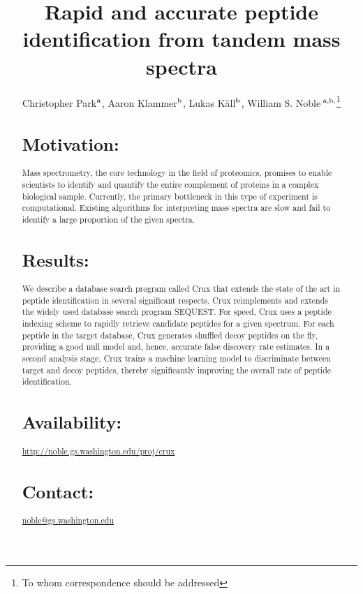 \documentclass{bioinfo}
\begin{document}

\title[Rapid and accurate peptide identification]{Rapid and accurate
  peptide identification from tandem mass spectra}
\author[Park \textit{et~al}]{Christopher Park$^{\rm a}$,
Aaron Klammer$^{\rm b}$,
Lukas K\"{a}ll$^{\rm b}$, 
William S. Noble\,$^{\rm a,b,}$\footnote{To whom correspondence should be addressed}}
\address{
$^{\rm a}$Department of Computer Science and Engineering,
$^{\rm b}$Department of Genome Sciences, University of Washington,
  Seattle, WA, USA
}


\maketitle

\begin{abstract}
\section{Motivation:}  Mass spectrometry, the core technology in the
field of proteomics, promises to enable scientists to identify and
quantify the entire complement of proteins in a complex biological
sample.  Currently, the primary bottleneck in this type of experiment
is computational.  Existing algorithms for interpreting mass spectra
are slow and fail to identify a large proportion of the given spectra.

\section{Results:} We describe a database search program called Crux
that extends the state of the art in peptide identification in several
significant respects.  Crux reimplements and extends the widely used
database search program SEQUEST.  For speed, Crux uses a peptide
indexing scheme to rapidly retrieve candidate peptides for a given
spectrum.  For each peptide in the target database, Crux generates
shuffled decoy peptides on the fly, providing a good null model and,
hence, accurate false discovery rate estimates.  In a second analysis
stage, Crux trains a machine learning model to discriminate between
target and decoy peptides, thereby significantly improving the overall
rate of peptide identification.

\section{Availability:}
\href{http://noble.gs.washington.edu/proj/crux}{http://noble.gs.washington.edu/proj/crux}
\section{Contact:} \href{noble@gs.washington.edu}{noble@gs.washington.edu}
\end{abstract}
\end{document}
